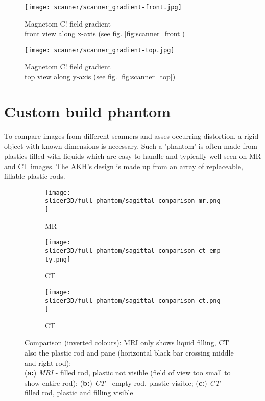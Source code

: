 \begin{figure}[!htb]
  	\centering
    \texttt{[image: scanner/scanner\_gradient-front.jpg]}
    \caption{Magnetom C! field gradient\\ front view along x-axis (see fig. \ref{fig:scanner_front}) \cite{magnetom_handbook}}
    \label{fig:gradient_front}
    \end{figure}

\begin{figure}[!htb]
  	\centering
    \texttt{[image: scanner/scanner\_gradient-top.jpg]}
    \caption{Magnetom C! field gradient\\ top view along y-axis (see fig. \ref{fig:scanner_top}) \cite{magnetom_handbook}}
    \label{fig:gradient_top}
\end{figure}


\section{Custom build phantom}

To compare images from different scanners and asses occurring distortion, a rigid object with known dimensions is necessary.
Such a 'phantom' is often made from plastics filled with liquids which are easy to handle and typically well seen on MR and CT images.
The AKH's design is made up from an array of replaceable, fillable plastic rods.

\begin{figure}[!htb]
\centering
  \begin{subfigure}[b]{0.1\textwidth}
    \texttt{[image: slicer3D/full\_phantom/sagittal\_comparison\_mr.png]}
    \caption{MR}
    \label{fig:sagittal_comparison_mr}
  \end{subfigure}
  \begin{subfigure}[b]{0.1\textwidth}
    \texttt{[image: slicer3D/full\_phantom/sagittal\_comparison\_ct\_empty.png]}
    \caption{CT}
    \label{fig:sagittal_comparison_ct_empty}
  \end{subfigure}
  \begin{subfigure}[b]{0.1\textwidth}
    \texttt{[image: slicer3D/full\_phantom/sagittal\_comparison\_ct.png]}
    \caption{CT}
    \label{fig:sagittal_comparison_ct}
  \end{subfigure}
  \caption{Comparison (inverted colours): MRI only shows liquid filling, CT also the plastic rod and pane (horizontal black bar crossing middle and right rod);\\ (\textbf{a:}) \textit{MRI} - filled rod, plastic not visible (field of view too small to show entire rod); (\textbf{b:}) \textit{CT} - empty rod, plastic visible; (\textbf{c:}) \textit{CT} - filled rod, plastic and filling visible}
  \label{fig:sagittal_comparison}
\end{figure}

